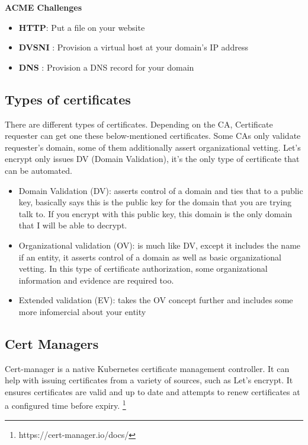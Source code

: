 \documentclass{article}
\begin{document}
\textbf{ACME Challenges}  

\begin{itemize}
    


\item \textbf{HTTP}: Put a file on your website   
\item \textbf{DVSNI} : Provision a virtual host at your domain’s IP address  
\item \textbf{DNS} : Provision a DNS record for your domain

\end{itemize}
\subsection{Types of certificates }
There are different types of certificates. Depending on the CA, Certificate requester can get one these below-mentioned certificates. Some CAs only validate requester's domain, some of them additionally assert  organizational vetting. Let’s encrypt only issues DV (Domain Validation), it’s the only type of certificate that can be automated.
\begin{itemize}
    

\item Domain Validation (DV): asserts control of a domain and ties that to a public key, basically says this is the public key for the domain that you are trying talk to. If you encrypt with this public key, this domain is the only domain that I will be able to decrypt. 

\item Organizational validation (OV): is much like DV, except it includes the name if an entity, it asserts control of a domain as well as basic organizational vetting.  In this type of certificate authorization, some organizational information and evidence are required too. 


\item Extended validation (EV): takes the OV concept further and includes some more infomercial about your entity
\end{itemize}



\subsection{Cert Managers} 

 Cert-manager is a native Kubernetes certificate management controller. It can help with issuing certificates from a variety of sources, such as Let’s encrypt. It ensures certificates are valid and up to date and attempts to renew certificates at a configured time before expiry. \footnote{https://cert-manager.io/docs/}
\end{document}
